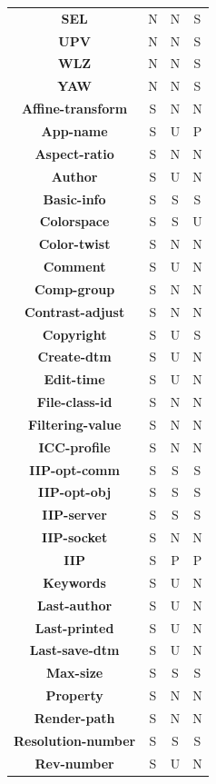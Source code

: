\documentclass[11pt]{article}
\newcommand{\com}[1]{\textbf{#1}}
\begin{document}
\begin{table}[!hp]
{\begin{tabular}{|c|c|c|c|}
\com{SEL}  & N & N & S \\
\com{UPV}  & N & N & S \\
\com{WLZ}  & N & N & S \\
\com{YAW}  & N & N & S \\
\hline
\com{Affine-transform}  & S & N & N \\
\com{App-name}          & S & U & P \\
\com{Aspect-ratio}      & S & N & N \\
\com{Author}            & S & U & N \\
\com{Basic-info}        & S & S & S \\
\com{Colorspace}        & S & S & U \\
\com{Color-twist}       & S & N & N \\
\com{Comment}           & S & U & N \\
\com{Comp-group}        & S & N & N \\
\com{Contrast-adjust}   & S & N & N \\
\com{Copyright}         & S & U & S \\
\com{Create-dtm}        & S & U & N \\
\com{Edit-time}         & S & U & N \\
\com{File-class-id}     & S & N & N \\
\com{Filtering-value}   & S & N & N \\
\com{ICC-profile}       & S & N & N \\
\com{IIP-opt-comm}      & S & S & S \\
\com{IIP-opt-obj}       & S & S & S \\
\com{IIP-server}        & S & S & S \\
\com{IIP-socket}        & S & N & N \\
\com{IIP}               & S & P & P \\
\com{Keywords}          & S & U & N \\
\com{Last-author}       & S & U & N \\
\com{Last-printed}      & S & U & N \\
\com{Last-save-dtm}     & S & U & N \\
\com{Max-size}          & S & S & S \\
\com{Property}          & S & N & N \\
\com{Render-path}       & S & N & N \\
\com{Resolution-number} & S & S & S \\
\com{Rev-number}        & S & U & N \\

\end{tabular}}
\end{table}
\end{document}
